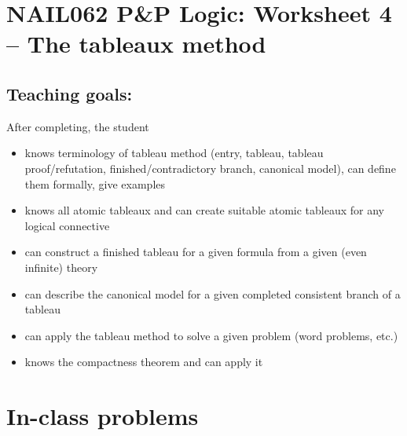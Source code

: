 \section*{NAIL062 P\&P Logic: Worksheet 4 -- The tableaux method}



\subsection*{Teaching goals:} After completing, the student

    \begin{itemize}\setlength{\itemsep}{0pt}
        \item knows terminology of tableau method (entry, tableau, tableau proof/refutation, finished/contradictory branch, canonical model), can define them formally, give examples
        \item knows all atomic tableaux and can create suitable atomic tableaux for any logical connective
        \item can construct a finished tableau for a given formula from a given (even infinite) theory
        \item can describe the canonical model for a given completed consistent branch of a tableau
        \item can apply the tableau method to solve a given problem (word problems, etc.)
        \item knows the compactness theorem and can apply it
    \end{itemize}

    

\section*{In-class problems}


